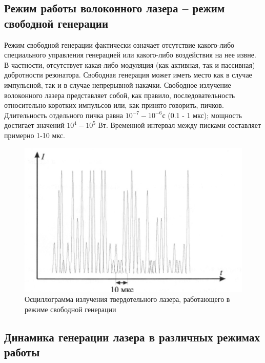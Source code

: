 \documentclass[a4paper, 12pt]{article}
\begin{document}
	\subsection{Режим работы волоконного лазера – режим свободной генерации}
	Режим свободной генерации фактически означает отсутствие какого-либо специального управления генерацией или какого-либо воздействия на нее извне. В частности, отсутствует какая-либо модуляция (как активная, так и пассивная) добротности резонатора. Свободная генерация может иметь место как в случае импульсной, так и в случае непрерывной накачки. Свободное излучение волоконного лазера представляет собой, как правило, последовательность относительно коротких импульсов или, как принято говорить, пичков. Длительность отдельного пичка равна $10^{-7}-10^{-6}с$ (0.1 - 1 мкс); мощность достигает значений $10^4-10^5$ Вт. Временной интервал между писками составляет примерно 1-10 мкс.
	\begin{figure}[!htb]
		\centering
		\includegraphics[scale=0.4]{pic1.jpg}
		\caption{Осциллограмма излучения твердотельного лазера, работающего в режиме свободной генерации}
	\end{figure}
	\subsection{Динамика генерации лазера в различных режимах работы}
\end{document}
